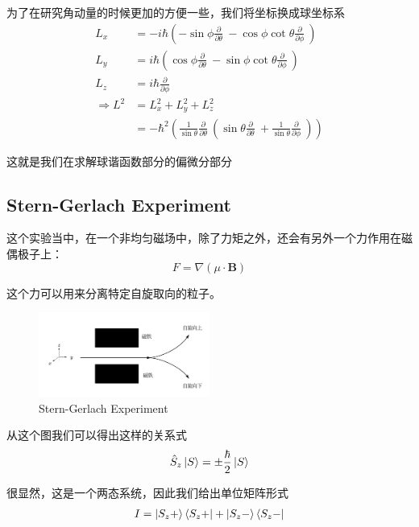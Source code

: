 \documentclass{article}
\newcommand{\Da}[2]{\frac{\partial}{\partial#2}#1}
\begin{document}
为了在研究角动量的时候更加的方便一些，我们将坐标换成球坐标系
\begin{align*}
    L_x&=-i\hbar\left(-\sin\phi\Da{~}{\theta}-\cos\phi\cot\theta\Da{~}{\phi}\right)\\
    L_y&=i\hbar\left(\cos\phi\Da{~}{\theta}-\sin\phi\cot\theta\Da{~}{\phi}\right)\\
    L_z&=i\hbar\Da{~}{\phi}\\
    \Rightarrow L^2&=L_x^2+L_y^2+L_z^2\\
    &=-\hbar^2\left(\frac{1}{\sin\theta}\Da{~}{\theta}\left(\sin\theta\Da{~}{\theta}+\frac{1}{\sin\theta}\Da{~}{\phi}\right)\right)
\end{align*}

这就是我们在求解球谐函数部分的偏微分部分


\subsection{Stern-Gerlach Experiment}

这个实验当中，在一个非均匀磁场中，除了力矩之外，还会有另外一个力作用在磁偶极子上：
\begin{equation*}
    F=\nabla\left(\mu\cdot \textbf{B}\right)
\end{equation*}

这个力可以用来分离特定自旋取向的粒子。

\begin{figure}[hbtp]
    \centering
    \includegraphics[width=0.5\textwidth]{figure/stern_gerlach.png}
    \caption{Stern-Gerlach Experiment}
\end{figure}

从这个图我们可以得出这样的关系式
\begin{equation*}
    \hat{S}_z\ket{S}=\pm \frac{\hbar}{2}\ket{S}
\end{equation*}

很显然，这是一个两态系统，因此我们给出单位矩阵形式
\begin{align*}
    I=\ket{S_z+}\bra{S_z+}+\ket{S_z-}\bra{S_z-}
\end{align*}
\end{document}
